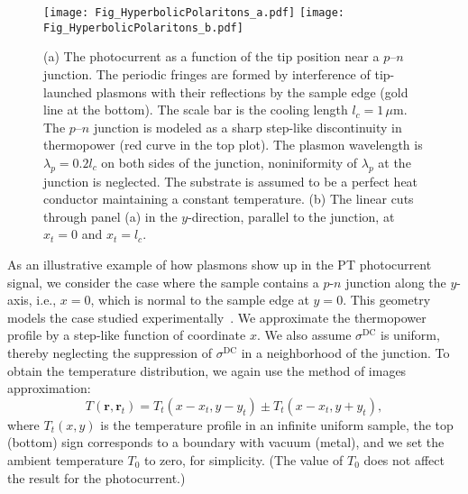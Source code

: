 \documentclass[aps, prb, reprint, superscriptaddress]{revtex4-2}
\renewcommand{\vec}{\mathbf}
\begin{document}
\begin{figure*}
	\texttt{[image: Fig\_HyperbolicPolaritons\_a.pdf]}
	\texttt{[image: Fig\_HyperbolicPolaritons\_b.pdf]}
	\caption{
		(a) 
		The photocurrent as a function of the tip position near a $p$--$n$ junction. 
		The periodic fringes are formed by interference of tip-launched plasmons with their reflections by the sample edge (gold line at the bottom). 
		The scale bar is the cooling length $l_c = 1\, \mu$m.
		The $p$--$n$ junction is modeled as a sharp step-like discontinuity in thermopower (red curve in the top plot). The plasmon wavelength is ${\lambda_p} = 0.2 l_c$ on both sides of the junction, noniniformity of ${\lambda_p}$ at the junction is neglected. 
		The substrate is assumed to be a perfect heat conductor maintaining a constant temperature. 
		(b)
		The linear cuts through panel (a) in the $y$-direction, parallel to the junction, at $x_t = 0$ and $x_t = l_c$. 
	}
\label{fig:Device_Plots}
\end{figure*}

As an illustrative example of how plasmons show up in the PT photocurrent signal, we consider the case
where the sample contains a $p$-$n$ junction along the $y$-axis, i.e., $x = 0$, which is normal to the sample edge at $y = 0$.
This geometry models the case studied experimentally~\cite{AlonsoGonzalez2016}.
We approximate the thermopower profile by a step-like function of coordinate $x$.
We also assume $\sigma^\mathrm{DC}$ is uniform, thereby neglecting the suppression of $\sigma^\mathrm{DC}$ in a neighborhood of the junction.
To obtain the temperature distribution, we again use the method of images approximation:
\begin{equation}
T(\vec{r},\vec{r}_t) = T_t(x - x_{t}, y - y_{t}) \pm T_t(x - x_{t}, y + y_{t}),
\label{eqn:T_GF_image} 
\end{equation}
where $T_t(x, y)$ is the temperature profile in an infinite uniform sample,
the top (bottom) sign corresponds to a boundary with vacuum (metal), and we set the ambient temperature $T_0$ to zero, for simplicity. (The value of $T_0$ does not affect the result for the photocurrent.) 
\end{document}
